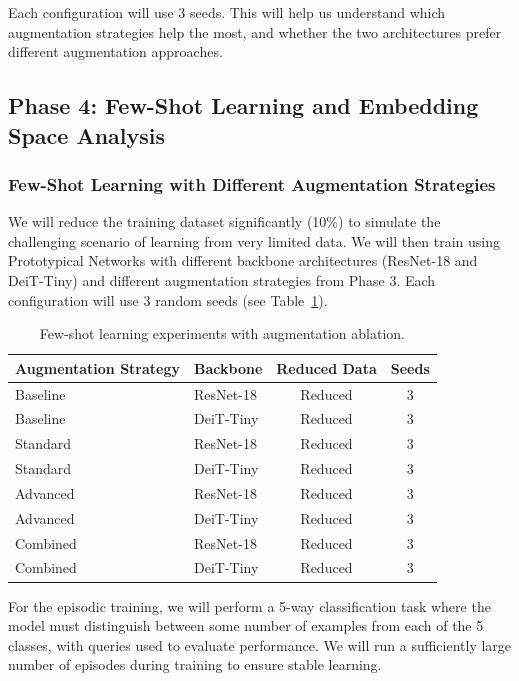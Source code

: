 \documentclass[12pt,a4paper]{article}
\begin{document}
Each configuration will use 3 seeds. This will help us understand which augmentation strategies help the most, and whether the two architectures prefer different augmentation approaches.

\subsection{Phase 4: Few-Shot Learning and Embedding Space Analysis}

\subsubsection{Few-Shot Learning with Different Augmentation Strategies}

We will reduce the training dataset significantly (10\%) to simulate the challenging scenario of learning from very limited data. We will then train using Prototypical Networks with different backbone architectures (ResNet-18 and DeiT-Tiny) and different augmentation strategies from Phase 3. Each configuration will use 3 random seeds (see Table~\ref{tab:fewshot_experiments}).

\begin{table}[H]
\centering
\caption{Few-shot learning experiments with augmentation ablation.}
\label{tab:fewshot_experiments}
\begin{tabular}{@{}llcc@{}}
\toprule
\textbf{Augmentation Strategy} & \textbf{Backbone} & \textbf{Reduced Data} & \textbf{Seeds} \\
\midrule
Baseline & ResNet-18 & Reduced & 3 \\
Baseline & DeiT-Tiny & Reduced & 3 \\
Standard & ResNet-18 & Reduced & 3 \\
Standard & DeiT-Tiny & Reduced & 3 \\
Advanced & ResNet-18 & Reduced & 3 \\
Advanced & DeiT-Tiny & Reduced & 3 \\
Combined & ResNet-18 & Reduced & 3 \\
Combined & DeiT-Tiny & Reduced & 3 \\
\bottomrule
\end{tabular}
\end{table}

For the episodic training, we will perform a 5-way classification task where the model must distinguish between some number of examples from each of the 5 classes, with queries used to evaluate performance. We will run a sufficiently large number of episodes during training to ensure stable learning.
\end{document}
